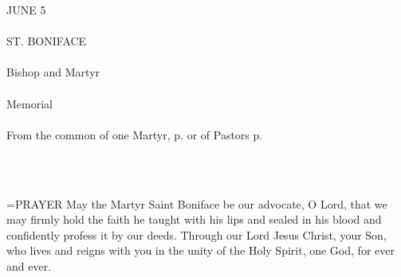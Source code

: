 \begin{center}\normalsize \begin{center}\normalsize JUNE 5\\\\
\footnotesize \footnotesize ST. BONIFACE\\\\
\footnotesize \footnotesize Bishop and Martyr\\\\
\footnotesize \footnotesize Memorial\\\\
\footnotesize \footnotesize From the common of one Martyr, p.    or of Pastors p. \\\\
\footnotesize \end{center}\\
\end{center}

\hangindent=\parindent \small{PRAYER 
May the Martyr Saint Boniface be our advocate, O Lord,
that we may firmly hold the faith
he taught with his lips and sealed in his blood
and confidently profess it by our deeds.
Through our Lord Jesus Christ, your Son,
who lives and reigns with you in the unity of the Holy Spirit,
one God, for ever and ever.\\}
 
